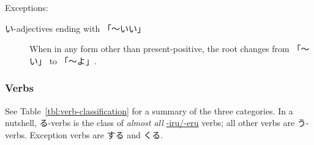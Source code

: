 \documentclass[../nihongo-gakushuu-kyouzai.tex]{subfiles}
\begin{document}
\color{red}
Exceptions:
\begin{description}
    \item[い-adjectives ending with 「〜いい」] When in any form other than present-positive, the root changes from 「〜い」 to 「〜よ」.
\end{description}
\color{black}


\subsubsection{Verbs}
See Table~\ref{tbl:verb-classification} for a summary of the three categories. In a nutshell, る-verbs is the class of \emph{almost all} \ul{-iru/-eru} verbs; all other verbs are う-verbs. Exception verbs are する and くる. 
\end{document}
